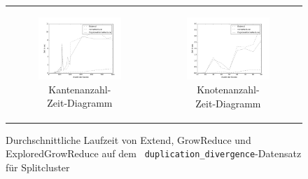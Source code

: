 \documentclass[12pt,a4paper,onecolumn,oneside,titlepage]{article}
\newcommand{\vars}{\texttt}
\begin{document}
\begin{figure}
  \centering
  \begin{tabular}[c]{cc}
    \begin{subfigure}[b]{0.5\textwidth}
        \includegraphics[scale=0.37]{plots/time_edge.png}
       \caption{Kantenanzahl-Zeit-Diagramm}
    \end{subfigure}&
    \begin{subfigure}[b]{0.5\textwidth}
        \includegraphics[scale=0.37]{plots/time_node.png}
       \caption{Knotenanzahl-Zeit-Diagramm}
    \end{subfigure}
  \end{tabular}
  \caption{Durchschnittliche Laufzeit von Extend, GrowReduce und ExploredGrowReduce auf dem \vars{
  duplication\_divergence}-Datensatz für Splitcluster}
  \label{fig:time}
\end{figure}
\end{document}
